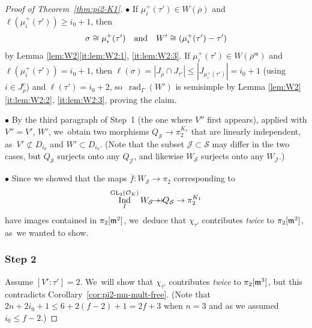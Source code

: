 \documentclass[JEP,XML,SOM,Unicode,NoFloatCountersInSection, NoEqCountersInSection,published]{cedram}
\newcommand{\onto}{\mathchoice{\to\hspace*{-5mm}\to}{\mathrel{\hbox{$\to\hspace*{-2.85mm}\to$}}}{\to\hspace*{-3mm}\to}{\to\hspace*{-3mm}\to}}
\newcommand{\quand}{\quad\text{and}\quad}
\newcommand{\sbullet}{{\scriptscriptstyle\bullet}}
\let\ovl\overline
\newcommand{\cJ}{{\mathcal{J}}}
\newcommand{\cO}{\mathcal{O}}
\newcommand{\cS}{\mathcal{S}}
\renewcommand{\ss}{\mathrm{ss}}
\newcommand{\brho}{\overline{\rho}}
\DeclareMathOperator{\GL}{GL}
\DeclareMathOperator{\Ind}{Ind}
\DeclareMathOperator{\rad}{rad}
\theoremstyle{plain}
\theoremstyle{definition}
\begin{document}
\begin{proof}[Proof of Theorem~\ref{thm:pi2-K1}]
$\sbullet$ If $\mu_i^+(\tau') \in W(\brho)$ and $\ell(\mu_i^+(\tau')) \ge i_0+1$, then
\[
\sigma \cong \mu_i^+(\tau')\quand W' \cong (\mu_i^+(\tau') \-- \tau')
\]
by Lemma \ref{lem:W2}\eqref{it:lem:W2:1}, \eqref{it:lem:W2:3}.
If $\mu_i^+(\tau') \in W(\brho^\ss)$ and $\ell(\mu_i^+(\tau')) = i_0+1$, then $\ell(\sigma) = |J_{\brho} \cap J_{\tau'}| \le |J_{\mu_i^+(\tau')}| = i_0+1$ (using $i \in J_{\brho}^c$) and $\ell(\tau') = i_0+2$, so~$\rad_\Gamma(W')$ is semisimple by Lemma \ref{lem:W2}\eqref{it:lem:W2:2}, \eqref{it:lem:W2:3}, proving the claim.

$\sbullet$ By the third paragraph of Step~1 (the one where $V''$ first appears), applied with $V'' \!=\! V'$, \resp $W'$, we~obtain two morphisms $Q_\cS \to \pi_2^{K_1}$ that are linearly independent, as~$V' \not\subset D_{i_0}$ and $W' \subset D_{i_0}$.
{(Note that the subset $\cJ \subset \cS$ may differ in the two cases, but $Q_\cS$ surjects onto any $Q_\cJ$, and likewise $W_\cS$ surjects onto any $W_\cJ$.)}

$\sbullet$ Since we showed that the maps $\ovl f: W_\cS \to \pi_2$ corresponding to
\[
\Ind_I^{\GL_2(\cO_K)} W_\cS \onto Q_\cS \to \pi_2^{K_1}
\]
have images contained in $\pi_2[\mathfrak{m}^2]$, we~deduce that $\chi_{\tau'}$ contributes \emph{twice} to $\pi_2[\mathfrak{m}^2]$, as~we wanted to show.

\subsubsection*{Step 2} Assume $[V':\tau'] = 2$. We~will show that $\chi_{\tau'}$ contributes \emph{twice} to $\pi_2[\mathfrak{m}^3]$, but this contradicts Corollary~\ref{cor:pi2-mn-mult-free}.
(Note that $2n+2i_0+1 \le 6+2(f-2)+1 = 2f+3$ when $n = 3$ and as we assumed $i_0 \le f-2$.)


\end{proof}
\end{document}

